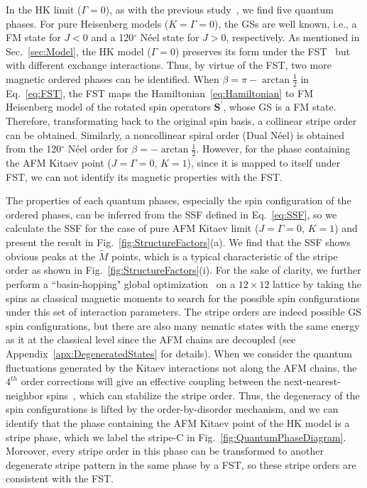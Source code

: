 \documentclass[aps,prb,reprint,amsfonts,amsmath,amssymb,showpacs,groupedaddress,superscriptaddress]{revtex4-1}
\begin{document}
In the HK limit ($\Gamma=0$), as with the previous study~\cite{KaiLi2015}, we find five quantum phases. For pure Heisenberg models ($K=\Gamma=0$), the GSs are well known, i.e., a FM state for $J<0$ and a 120$^\circ$ N\'{e}el state for $J>0$, respectively. As mentioned in Sec.~\ref{sec:Model}, the HK model ($\Gamma=0$) preserves its form under the FST~\cite{PhysRevB.89.014414} but with different exchange interactions. Thus, by virtue of the FST, two more magnetic ordered phases can be identified. When $\beta=\pi - \arctan\frac{1}{2}$ in Eq.~\eqref{eq:FST}, the FST maps the Hamiltonian~\eqref{eq:Hamiltonian} to FM Heisenberg model of the rotated spin operators $\bm{S}^{\prime}$, whose GS is a FM state. Therefore, transformating back to the original spin basis, a collinear stripe order can be obtained. Similarly, a noncollinear spiral order (Dual N\'{e}el) is obtained from the 120$^\circ$ N\'{e}el order for $\beta=-\arctan\frac{1}{2}$. However, for the phase containing the AFM Kitaev point ($J=\Gamma=0$, $K=1$), since it is mapped to itself under FST, we can not identify its magnetic properties with the FST.

The properties of each quantum phases, especially the spin configuration of the ordered phases, can be inferred from the SSF defined in Eq.~\eqref{eq:SSF}, so we calculate the SSF for the case of pure AFM Kitaev limit ($J=\Gamma=0$, $K=1$) and present the result in Fig.~\ref{fig:StructureFactors}(a). We find that the SSF shows obvious peaks at the $\tilde{M}$ points, which is a typical characteristic of the stripe order as shown in Fig.~\ref{fig:StructureFactors}(i). For the sake of clarity, we further perform a ``basin-hopping" global optimization~\cite{jp970984n} on a $12 \times 12$ lattice by taking the spins as classical magnetic moments to search for the possible spin configurations under this set of interaction parameters. The stripe orders are indeed possible GS spin configurations, but there are also many nematic states with the same energy as it at the classical level since the AFM chains are decoupled (see Appendix~\ref{apx:DegeneratedStates} for details). When we consider the quantum fluctuations generated by the Kitaev interactions not along the AFM chains, the $4^{th}$ order corrections will give an effective coupling between the next-nearest-neighbor spins~\cite{PhysRevB.92.184416}, which can stabilize the stripe order. Thus, the degeneracy of the spin configurations is lifted by the order-by-disorder mechanism, and we can identify that the phase containing the AFM Kitaev point of the HK model is a stripe phase, which we label the stripe-C in Fig.~\ref{fig:QuantumPhaseDiagram}. Moreover, every stripe order in this phase can be transformed to another degenerate stripe pattern in the same phase by a FST, so these stripe orders are consistent with the FST.
\end{document}
